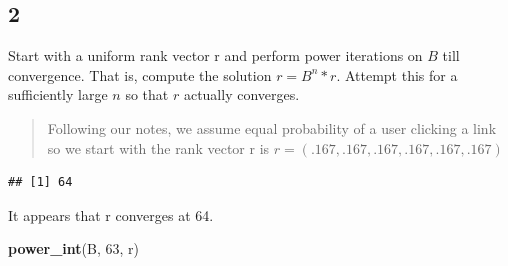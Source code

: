 \documentclass[]{article}
\newenvironment{Shaded}{\begin{snugshade}}{\end{snugshade}}
\newcommand{\KeywordTok}[1]{\textcolor[rgb]{0.13,0.29,0.53}{\textbf{{#1}}}}
\newcommand{\DecValTok}[1]{\textcolor[rgb]{0.00,0.00,0.81}{{#1}}}
\newcommand{\StringTok}[1]{\textcolor[rgb]{0.31,0.60,0.02}{{#1}}}
\newcommand{\NormalTok}[1]{{#1}}
\begin{document}
\subsection{2}\label{section-1}

Start with a uniform rank vector r and perform power iterations on \(B\)
till convergence. That is, compute the solution \(r = B^n * r\). Attempt
this for a sufficiently large \(n\) so that \(r\) actually converges.

\begin{quote}
Following our notes, we assume equal probability of a user clicking a
link so we start with the rank vector r is
\(r = (.167, .167, .167, .167, .167, .167)\)
\end{quote}

\begin{Shaded}
\end{Shaded}

\begin{verbatim}
## [1] 64
\end{verbatim}

It appears that r converges at 64.

\begin{Shaded}
\begin{Highlighting}[]
\KeywordTok{power_int}\NormalTok{(B, }\DecValTok{63}\NormalTok{, r)}
\end{Highlighting}
\end{Shaded}
\end{document}
